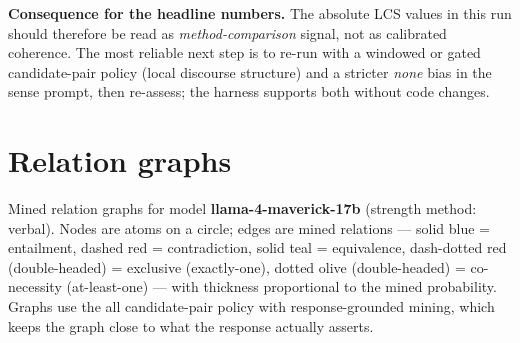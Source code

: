 \documentclass[11pt]{article}
\begin{document}
\textbf{Consequence for the headline numbers.} The absolute LCS values in this run should therefore be read as \emph{method-comparison} signal, not as calibrated coherence. The most reliable next step is to re-run with a windowed or gated candidate-pair policy (local discourse structure) and a stricter \emph{none} bias in the sense prompt, then re-assess; the harness supports both without code changes.

\section{Relation graphs}\label{sec:graphs}

Mined relation graphs for model \textbf{llama-4-maverick-17b} (strength method: verbal). Nodes are atoms on a circle; edges are mined relations --- solid blue = entailment, dashed red = contradiction, solid teal = equivalence, dash-dotted red (double-headed) = exclusive (exactly-one), dotted olive (double-headed) = co-necessity (at-least-one) --- with thickness proportional to the mined probability. Graphs use the all candidate-pair policy with response-grounded mining, which keeps the graph close to what the response actually asserts.
\end{document}
